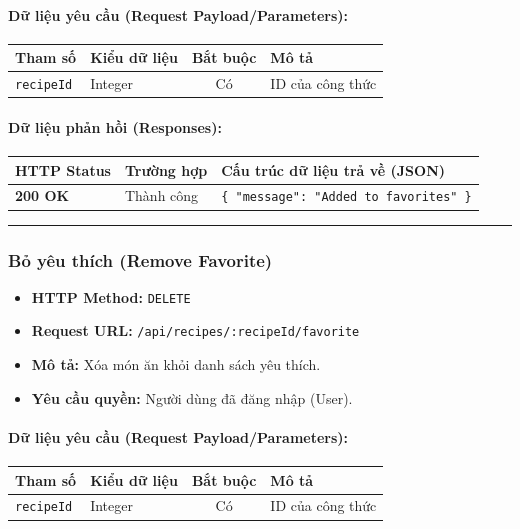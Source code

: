 \documentclass[12pt,a4paper]{article}
\begin{document}
\paragraph{Dữ liệu yêu cầu (Request Payload/Parameters):}
\begin{longtable}{|p{2.8cm}|p{2.2cm}|c|p{7.0cm}|}
\hline
\textbf{Tham số} & \textbf{Kiểu dữ liệu} & \textbf{Bắt buộc} & \textbf{Mô tả} \\ \hline
\endhead
\texttt{recipeId} & Integer & Có & ID của công thức \\ \hline
\end{longtable}

\paragraph{Dữ liệu phản hồi (Responses):}
\begin{longtable}{|p{2.8cm}|p{3.2cm}|p{8.0cm}|}
\hline
\textbf{HTTP Status} & \textbf{Trường hợp} & \textbf{Cấu trúc dữ liệu trả về (JSON)} \\ \hline
\endhead
\textbf{200 OK} & Thành công & \texttt{\{ "message": "Added to favorites" \}} \\ \hline
\end{longtable}

\vskip 0.4cm
\noindent\rule{\textwidth}{0.3pt}
\vskip 0.4cm

\subsubsection{Bỏ yêu thích (Remove Favorite)}
\begin{itemize}[leftmargin=*]
    \item \textbf{HTTP Method:} \texttt{DELETE}
    \item \textbf{Request URL:} \texttt{/api/recipes/:recipeId/favorite}
    \item \textbf{Mô tả:} Xóa món ăn khỏi danh sách yêu thích.
    \item \textbf{Yêu cầu quyền:} Người dùng đã đăng nhập (User).
\end{itemize}

\paragraph{Dữ liệu yêu cầu (Request Payload/Parameters):}
\begin{longtable}{|p{2.8cm}|p{2.2cm}|c|p{7.0cm}|}
\hline
\textbf{Tham số} & \textbf{Kiểu dữ liệu} & \textbf{Bắt buộc} & \textbf{Mô tả} \\ \hline
\endhead
\texttt{recipeId} & Integer & Có & ID của công thức \\ \hline
\end{longtable}
\end{document}
